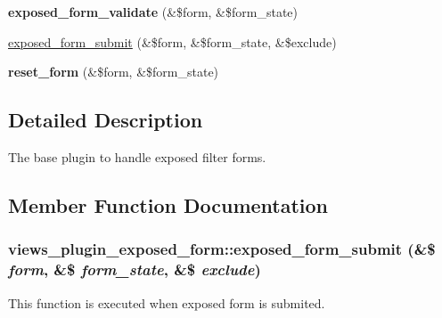 \begin{DoxyCompactItemize}
\item 
\hypertarget{classviews__plugin__exposed__form_abe35ca1f70c8aa4798b3e7ca238e4589}{
{\bfseries exposed\_\-form\_\-validate} (\&\$form, \&\$form\_\-state)}
\label{classviews__plugin__exposed__form_abe35ca1f70c8aa4798b3e7ca238e4589}

\item 
\hyperlink{classviews__plugin__exposed__form_abf01094ad23829d7223ea56c80cc424d}{exposed\_\-form\_\-submit} (\&\$form, \&\$form\_\-state, \&\$exclude)
\item 
\hypertarget{classviews__plugin__exposed__form_af4ec5df3a27b92616cbd2b63a3028459}{
{\bfseries reset\_\-form} (\&\$form, \&\$form\_\-state)}
\label{classviews__plugin__exposed__form_af4ec5df3a27b92616cbd2b63a3028459}

\end{DoxyCompactItemize}


\subsection{Detailed Description}
The base plugin to handle exposed filter forms. 

\subsection{Member Function Documentation}
\hypertarget{classviews__plugin__exposed__form_abf01094ad23829d7223ea56c80cc424d}{
\subsubsection[{exposed\_\-form\_\-submit}]{\setlength{\rightskip}{0pt plus 5cm}views\_\-plugin\_\-exposed\_\-form::exposed\_\-form\_\-submit (\&\$ {\em form}, \/  \&\$ {\em form\_\-state}, \/  \&\$ {\em exclude})}}
\label{classviews__plugin__exposed__form_abf01094ad23829d7223ea56c80cc424d}
This function is executed when exposed form is submited.


